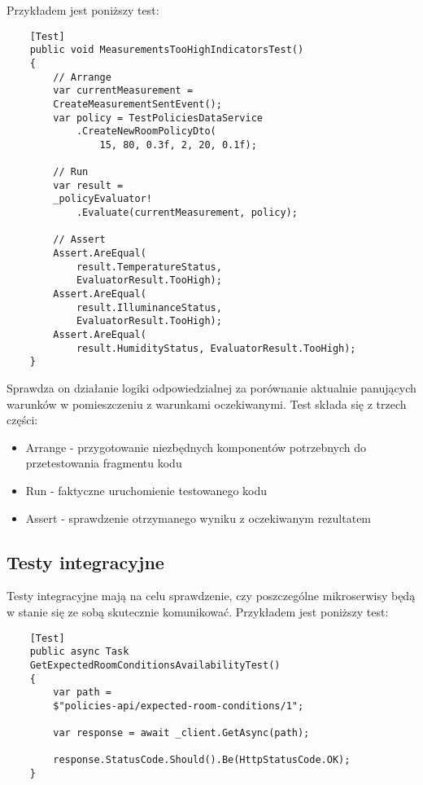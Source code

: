 Przykładem jest poniższy test:

\begin{lstlisting}
    [Test]
    public void MeasurementsTooHighIndicatorsTest()
    {
        // Arrange
        var currentMeasurement = 
        CreateMeasurementSentEvent();
        var policy = TestPoliciesDataService
            .CreateNewRoomPolicyDto(
                15, 80, 0.3f, 2, 20, 0.1f);

        // Run
        var result = 
        _policyEvaluator!
            .Evaluate(currentMeasurement, policy);
        
        // Assert
        Assert.AreEqual(
            result.TemperatureStatus, 
            EvaluatorResult.TooHigh);
        Assert.AreEqual(
            result.IlluminanceStatus, 
            EvaluatorResult.TooHigh);
        Assert.AreEqual(
            result.HumidityStatus, EvaluatorResult.TooHigh);
    }
\end{lstlisting}

Sprawdza on działanie logiki odpowiedzialnej za porównanie aktualnie panujących 
warunków w pomieszczeniu z warunkami oczekiwanymi. Test składa się z trzech części:

\begin{itemize} %
    \item Arrange - przygotowanie niezbędnych komponentów potrzebnych do przetestowania 
    fragmentu kodu
    \item Run - faktyczne uruchomienie testowanego kodu
    \item Assert - sprawdzenie otrzymanego wyniku z oczekiwanym rezultatem
\end{itemize}

\subsection{Testy integracyjne}

Testy integracyjne mają na celu sprawdzenie, czy poszczególne mikroserwisy będą 
w stanie się ze sobą skutecznie komunikować. Przykładem jest poniższy test:

\begin{lstlisting}
    [Test]
    public async Task 
    GetExpectedRoomConditionsAvailabilityTest()
    {
        var path = 
        $"policies-api/expected-room-conditions/1";
    
        var response = await _client.GetAsync(path);
    
        response.StatusCode.Should().Be(HttpStatusCode.OK);
    }    
\end{lstlisting}

